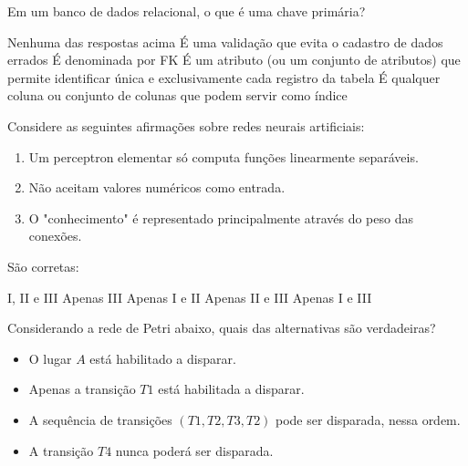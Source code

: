 \documentclass[12pt, addpoints]{exam}
\begin{document}
\begin{questions}
\begin{choices}
\end{choices}

\question

Em um banco de dados relacional, o que é uma chave primária?


\begin{choices}
\choice Nenhuma das respostas acima
\choice É uma validação que evita o cadastro de dados errados
\choice É denominada por FK
\choice É um atributo (ou um conjunto de atributos) que permite identificar única e exclusivamente cada registro da tabela
\choice É qualquer coluna ou conjunto de colunas que podem servir como índice
\end{choices}

\question

Considere as seguintes afirmações sobre redes neurais artificiais: \begin{enumerate}[label=\Roman*.] \item Um perceptron elementar só computa funções linearmente separáveis. \item Não aceitam valores numéricos como entrada. \item O "conhecimento" é representado principalmente através do peso das conexões. \end{enumerate} São corretas:
\begin{choices}
\choice I, II e III
\choice Apenas III
\choice Apenas I e II 
\choice Apenas II e III
\choice Apenas I e III
\end{choices}

\question

Considerando a rede de Petri abaixo, quais das alternativas são verdadeiras?



\begin{itemize}

    \item[I)] O lugar \( A \) está habilitado a disparar.

    \item[II)] Apenas a transição \( T1 \) está habilitada a disparar.

    \item[III)] A sequência de transições \( (T1, T2, T3, T2) \) pode ser disparada, nessa ordem.

    \item[IV)] A transição \( T4 \) nunca poderá ser disparada.


\end{itemize}
\end{questions}
\end{document}
